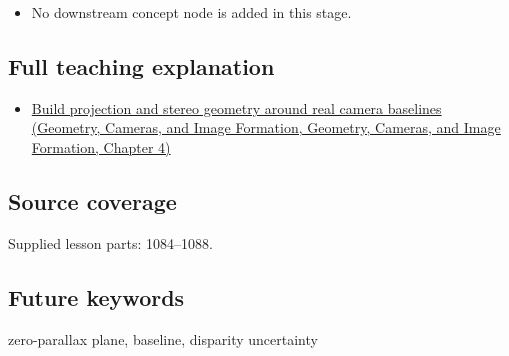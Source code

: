\begin{itemize}
\tightlist
\item
  No downstream concept node is added in this stage.
\end{itemize}

\subsection{Full teaching explanation}\label{appendix-0976e86e5b9f-full-teaching-explanation}

\begin{itemize}
\tightlist
\item
  \href{../03-Geometry-Cameras-and-Image-Formation/main.pdf\#nameddest=02-foundations-ii-ch035-build-projection-and-stereo-geometry-around-real-camera-baselines}{Build projection and stereo geometry around real camera baselines (Geometry, Cameras, and Image Formation, Geometry, Cameras, and Image Formation, Chapter 4)}
\end{itemize}

\subsection{Source coverage}\label{appendix-0976e86e5b9f-source-coverage}

Supplied lesson parts: 1084--1088.

\subsection{Future keywords}\label{appendix-0976e86e5b9f-future-keywords}

zero-parallax plane, baseline, disparity uncertainty
